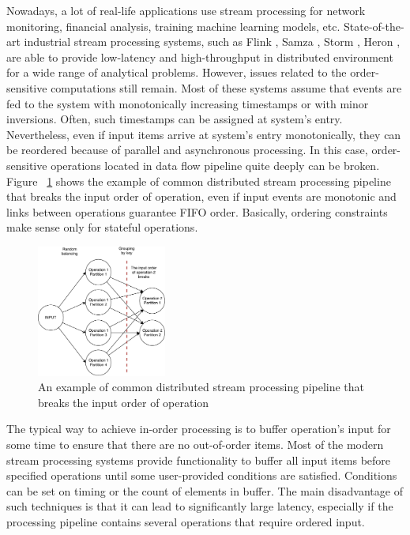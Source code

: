 
\label {fs-intro}

Nowadays, a lot of real-life applications use stream processing for network monitoring, financial analysis, training machine learning models, etc. State-of-the-art industrial stream processing systems, such as Flink \cite{carbone2015apache}, Samza \cite{Noghabi:2017:SSS:3137765.3137770}, Storm \cite{apache:storm}, Heron \cite{Kulkarni:2015:THS:2723372.2742788}, are able to provide low-latency and high-throughput in distributed environment for a wide range of analytical problems. However, issues related to the order-sensitive computations still remain. Most of these systems assume that events are fed to the system with monotonically increasing timestamps or with minor inversions. Often, such timestamps can be assigned at system's entry. Nevertheless, even if input items arrive at system's entry monotonically, they can be reordered because of parallel and asynchronous processing. In this case, order-sensitive operations located in data flow pipeline quite deeply can be broken. Figure ~\ref{break-order-dataflow} shows the example of common distributed stream processing pipeline that breaks the input order of operation, even if input events are monotonic and links between operations guarantee FIFO order. Basically, ordering constraints make sense only for stateful operations.

\begin{figure}[htbp]
  \centering
  \includegraphics[width=0.38\textwidth]{pics/break_order_pipeline}
  \caption{An  example of common distributed stream processing pipeline that breaks the input order of operation}
  \label {break-order-dataflow}
\end{figure}

The typical way to achieve in-order processing is to buffer operation's input for some time to ensure that there are no out-of-order items. Most of the modern stream processing systems provide functionality to buffer all input items before specified operations until some user-provided conditions are satisfied. Conditions can be set on timing or the count of elements in buffer. The main disadvantage of such techniques is that it can lead to significantly large latency, especially if the processing pipeline contains several operations that require ordered input. 

